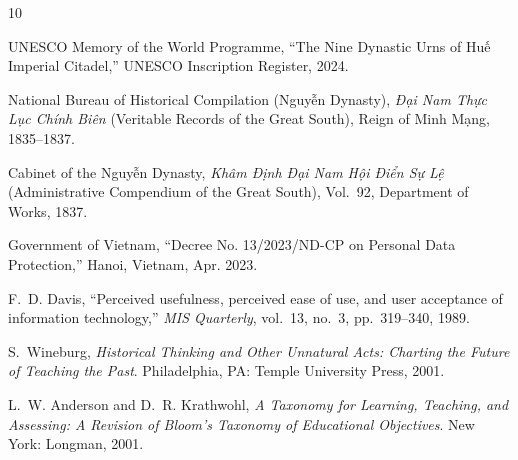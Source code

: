 \documentclass[journal]{IEEEtran}
\begin{document}

\begin{thebibliography}{10}

UNESCO Memory of the World Programme, ``The Nine Dynastic Urns of Huế Imperial Citadel,'' UNESCO Inscription Register, 2024.

National Bureau of Historical Compilation (Nguyễn Dynasty), \textit{Đại Nam Thực Lục Chính Biên} (Veritable Records of the Great South), Reign of Minh Mạng, 1835--1837.

Cabinet of the Nguyễn Dynasty, \textit{Khâm Định Đại Nam Hội Điển Sự Lệ} (Administrative Compendium of the Great South), Vol.~92, Department of Works, 1837.

Government of Vietnam, ``Decree No. 13/2023/ND-CP on Personal Data Protection,'' Hanoi, Vietnam, Apr. 2023.

F.~D. Davis, ``Perceived usefulness, perceived ease of use, and user acceptance of information technology,'' \textit{MIS Quarterly}, vol.~13, no.~3, pp.~319--340, 1989.

S.~Wineburg, \textit{Historical Thinking and Other Unnatural Acts: Charting the Future of Teaching the Past}. Philadelphia, PA: Temple University Press, 2001.

L.~W. Anderson and D.~R. Krathwohl, \textit{A Taxonomy for Learning, Teaching, and Assessing: A Revision of Bloom's Taxonomy of Educational Objectives}. New York: Longman, 2001.

\end{thebibliography}
\end{document}
